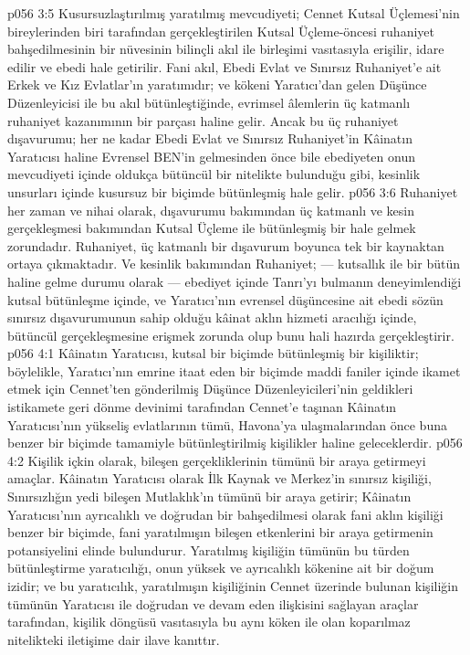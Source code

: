 \vs p056 3:5 Kusursuzlaştırılmış yaratılmış mevcudiyeti; Cennet Kutsal Üçlemesi’nin bireylerinden biri tarafından gerçekleştirilen Kutsal Üçleme\hyp{}öncesi ruhaniyet bahşedilmesinin bir nüvesinin bilinçli akıl ile birleşimi vasıtasıyla erişilir, idare edilir ve ebedi hale getirilir. Fani akıl, Ebedi Evlat ve Sınırsız Ruhaniyet’e ait Erkek ve Kız Evlatlar’ın yaratımıdır; ve kökeni Yaratıcı’dan gelen Düşünce Düzenleyicisi ile bu akıl bütünleştiğinde, evrimsel âlemlerin üç katmanlı ruhaniyet kazanımının bir parçası haline gelir. Ancak bu üç ruhaniyet dışavurumu; her ne kadar Ebedi Evlat ve Sınırsız Ruhaniyet’in Kâinatın Yaratıcısı haline Evrensel BEN’in gelmesinden önce bile ebediyeten onun mevcudiyeti içinde oldukça bütüncül bir nitelikte bulunduğu gibi, kesinlik unsurları içinde kusursuz bir biçimde bütünleşmiş hale gelir.
\vs p056 3:6 Ruhaniyet her zaman ve nihai olarak, dışavurumu bakımından üç katmanlı ve kesin gerçekleşmesi bakımından Kutsal Üçleme ile bütünleşmiş bir hale gelmek zorundadır. Ruhaniyet, üç katmanlı bir dışavurum boyunca tek bir kaynaktan ortaya çıkmaktadır. Ve kesinlik bakımından Ruhaniyet; --- kutsallık ile bir bütün haline gelme durumu olarak --- ebediyet içinde Tanrı’yı bulmanın deneyimlendiği kutsal bütünleşme içinde, ve Yaratıcı’nın evrensel düşüncesine ait ebedi sözün sınırsız dışavurumunun sahip olduğu kâinat aklın hizmeti aracılığı içinde, bütüncül gerçekleşmesine erişmek zorunda olup bunu hali hazırda gerçekleştirir.
\vs p056 4:1 Kâinatın Yaratıcısı, kutsal bir biçimde bütünleşmiş bir kişiliktir; böylelikle, Yaratıcı’nın emrine itaat eden bir biçimde maddi faniler içinde ikamet etmek için Cennet’ten gönderilmiş Düşünce Düzenleyicileri’nin geldikleri istikamete geri dönme devinimi tarafından Cennet’e taşınan Kâinatın Yaratıcısı’nın yükseliş evlatlarının tümü, Havona’ya ulaşmalarından önce buna benzer bir biçimde tamamiyle bütünleştirilmiş kişilikler haline geleceklerdir.
\vs p056 4:2 Kişilik içkin olarak, bileşen gerçekliklerinin tümünü bir araya getirmeyi amaçlar. Kâinatın Yaratıcısı olarak İlk Kaynak ve Merkez’in sınırsız kişiliği, Sınırsızlığın yedi bileşen Mutlaklık’ın tümünü bir araya getirir; Kâinatın Yaratıcısı’nın ayrıcalıklı ve doğrudan bir bahşedilmesi olarak fani aklın kişiliği benzer bir biçimde, fani yaratılmışın bileşen etkenlerini bir araya getirmenin potansiyelini elinde bulundurur. Yaratılmış kişiliğin tümünün bu türden bütünleştirme yaratıcılığı, onun yüksek ve ayrıcalıklı kökenine ait bir doğum izidir; ve bu yaratıcılık, yaratılmışın kişiliğinin Cennet üzerinde bulunan kişiliğin tümünün Yaratıcısı ile doğrudan ve devam eden ilişkisini sağlayan araçlar tarafından, kişilik döngüsü vasıtasıyla bu aynı köken ile olan koparılmaz nitelikteki iletişime dair ilave kanıttır.
